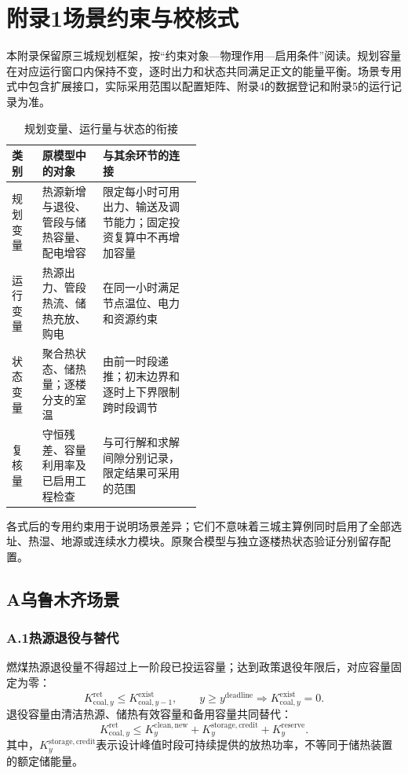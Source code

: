\clearpage
\section*{附录1\quad 场景约束与校核式}

本附录保留原三城规划框架，按“约束对象—物理作用—启用条件”阅读。规划容量在对应运行窗口内保持不变，逐时出力和状态共同满足正文的能量平衡。场景专用式中包含扩展接口，实际采用范围以配置矩阵、附录4的数据登记和附录5的运行记录为准。

\begin{table}[H]
\centering\small
\caption{规划变量、运行量与状态的衔接}
\begin{tabularx}{\linewidth}{@{}L{0.16\linewidth}L{0.32\linewidth}Y@{}}
\toprule
类别 & 原模型中的对象 & 与其余环节的连接\\\midrule
规划变量 & 热源新增与退役、管段与储热容量、配电增容 & 限定每小时可用出力、输送及调节能力；固定投资复算中不再增加容量\\
运行变量 & 热源出力、管段热流、储热充放、购电 & 在同一小时满足节点温位、电力和资源约束\\
状态变量 & 聚合热状态、储热量；逐楼分支的室温 & 由前一时段递推；初末边界和逐时上下界限制跨时段调节\\
复核量 & 守恒残差、容量利用率及已启用工程检查 & 与可行解和求解间隙分别记录，限定结果可采用的范围\\
\bottomrule
\end{tabularx}
\end{table}

各式后的专用约束用于说明场景差异；它们不意味着三城主算例同时启用了全部选址、热湿、地源或连续水力模块。原聚合模型与独立逐楼热状态验证分别留存配置。

\subsection*{A\quad 乌鲁木齐场景}

\subsubsection*{A.1\quad 热源退役与替代}

燃煤热源退役量不得超过上一阶段已投运容量；达到政策退役年限后，对应容量固定为零：
\begin{equation}
K_{\mathrm{coal},y}^{\mathrm{ret}}\leq K_{\mathrm{coal},y-1}^{\mathrm{exist}},
\qquad y\geq y^{\mathrm{deadline}}\Rightarrow K_{\mathrm{coal},y}^{\mathrm{exist}}=0.
\end{equation}
退役容量由清洁热源、储热有效容量和备用容量共同替代：
\begin{equation}
K_{\mathrm{coal},y}^{\mathrm{ret}}\leq
K_y^{\mathrm{clean,new}}+K_y^{\mathrm{storage,credit}}+K_y^{\mathrm{reserve}}.
\end{equation}
其中，$K_y^{\mathrm{storage,credit}}$表示设计峰值时段可持续提供的放热功率，不等同于储热装置的额定储能量。

